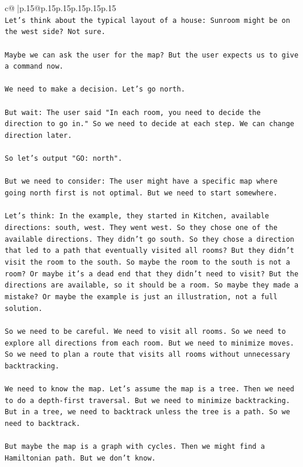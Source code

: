 \documentclass{article}
\begin{document}
{\begin{supertabular}{c@{$\;$}|p{.15\linewidth}@{}p{.15\linewidth}p{.15\linewidth}p{.15\linewidth}p{.15\linewidth}p{.15\linewidth}}
{{{\\ 
\texttt{Let's think about the typical layout of a house: Sunroom might be on the west side? Not sure.} \\
\\ 
\texttt{Maybe we can ask the user for the map? But the user expects us to give a command now.} \\
\\ 
\texttt{We need to make a decision. Let's go north.} \\
\\ 
\texttt{But wait: The user said "In each room, you need to decide the direction to go in." So we need to decide at each step. We can change direction later.} \\
\\ 
\texttt{So let's output "GO: north".} \\
\\ 
\texttt{But we need to consider: The user might have a specific map where going north first is not optimal. But we need to start somewhere.} \\
\\ 
\texttt{Let's think: In the example, they started in Kitchen, available directions: south, west. They went west. So they chose one of the available directions. They didn't go south. So they chose a direction that led to a path that eventually visited all rooms? But they didn't visit the room to the south. So maybe the room to the south is not a room? Or maybe it's a dead end that they didn't need to visit? But the directions are available, so it should be a room. So maybe they made a mistake? Or maybe the example is just an illustration, not a full solution.} \\
\\ 
\texttt{So we need to be careful. We need to visit all rooms. So we need to explore all directions from each room. But we need to minimize moves. So we need to plan a route that visits all rooms without unnecessary backtracking.} \\
\\ 
\texttt{We need to know the map. Let's assume the map is a tree. Then we need to do a depth{-}first traversal. But we need to minimize backtracking. But in a tree, we need to backtrack unless the tree is a path. So we need to backtrack.} \\
\\ 
\texttt{But maybe the map is a graph with cycles. Then we might find a Hamiltonian path. But we don't know.} \\
}}}
\end{supertabular}}
\end{document}
